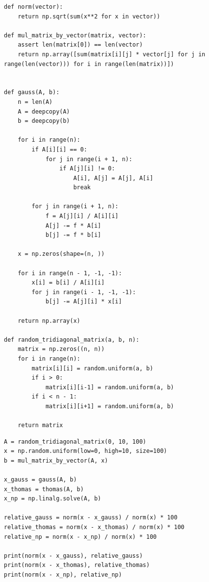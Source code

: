 \documentclass[a4paper, 14pt]{extarticle}
\begin{document}
\begin{figure}[H]
\begin{lstlisting}[language={},caption={Реализация вспомогательных функций},label={lst:code2}]
def norm(vector):
    return np.sqrt(sum(x**2 for x in vector))

def mul_matrix_by_vector(matrix, vector):
    assert len(matrix[0]) == len(vector)
    return np.array([sum(matrix[i][j] * vector[j] for j in range(len(vector))) for i in range(len(matrix))])


def gauss(A, b):
    n = len(A)
    A = deepcopy(A)
    b = deepcopy(b)

    for i in range(n):
        if A[i][i] == 0:
            for j in range(i + 1, n):
                if A[j][i] != 0:
                    A[i], A[j] = A[j], A[i]
                    break

        for j in range(i + 1, n):
            f = A[j][i] / A[i][i]
            A[j] -= f * A[i]
            b[j] -= f * b[i]

    x = np.zeros(shape=(n, ))

    for i in range(n - 1, -1, -1):
        x[i] = b[i] / A[i][i]
        for j in range(i - 1, -1, -1):
            b[j] -= A[j][i] * x[i]

    return np.array(x)

def random_tridiagonal_matrix(a, b, n):
    matrix = np.zeros((n, n))
    for i in range(n):
        matrix[i][i] = random.uniform(a, b)
        if i > 0:
            matrix[i][i-1] = random.uniform(a, b)
        if i < n - 1:
            matrix[i][i+1] = random.uniform(a, b)

    return matrix
\end{lstlisting}
\end{figure}

\begin{figure}[H]
\begin{lstlisting}[language={},caption={Оценка погрешностей},label={lst:code3}]
A = random_tridiagonal_matrix(0, 10, 100)
x = np.random.uniform(low=0, high=10, size=100)
b = mul_matrix_by_vector(A, x)

x_gauss = gauss(A, b)
x_thomas = thomas(A, b)
x_np = np.linalg.solve(A, b)

relative_gauss = norm(x - x_gauss) / norm(x) * 100
relative_thomas = norm(x - x_thomas) / norm(x) * 100
relative_np = norm(x - x_np) / norm(x) * 100

print(norm(x - x_gauss), relative_gauss)
print(norm(x - x_thomas), relative_thomas)
print(norm(x - x_np), relative_np)
\end{lstlisting}
\end{figure}
\end{document}
